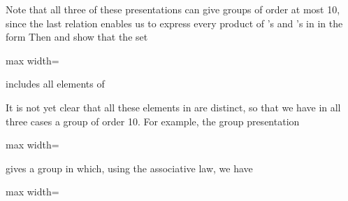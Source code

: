 \documentclass[11pt,oneside]{article}
\begin{document}
\begin{BookBody}



\end{BookBody}

\BookNarrativetrue

\begin{BookBody}

Note that all three of these presentations can give groups of order at most 10, since the last relation  enables us to express every product of ’s and ’s in  in the form  Then  and  show that the set

\begin{center}\begin{adjustbox}{max width=\linewidth}\end{adjustbox}\end{center}

\noindent includes all elements of 

It is not yet clear that all these elements in  are distinct, so that we have in all three cases a group of order 10. For example, the group presentation

\begin{center}\begin{adjustbox}{max width=\linewidth}\end{adjustbox}\end{center}

\noindent gives a group in which, using the associative law, we have

\begin{center}\begin{adjustbox}{max width=\linewidth}\end{adjustbox}\end{center}


\end{BookBody}
\end{document}
